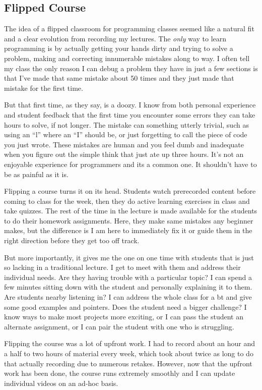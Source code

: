 \documentclass[10pt]{article}
\begin{document}
\subsection{Flipped Course}
The idea of a flipped classroom for programming classes seemed like a natural fit and  a clear evolution from recording my lectures.  
The \textit{only} way to learn programming is by actually getting your hands dirty and trying to solve a problem, making and correcting innumerable mistakes along to way.  
I often tell my class the only reason I can debug a problem  they have  in just a few sections is that I've made that same mistake about 50 times and they just made that mistake for the first time.

But that first time, as they say, is a doozy.  
I know from both personal experience  and student feedback that the first time you encounter some errors they can take hours to solve, if not longer.  
The mistake can  something utterly trivial, such as using an ``l'' where an ``I'' should be, or just forgetting to call the piece of code you just wrote.
These mistakes are human and you feel dumb and inadequate when you figure out the simple think that just ate up three hours.
It's not an enjoyable experience for programmers and its a common one.  
It shouldn't have to be as painful as it is.

Flipping a course turns it on its head.  
Students watch prerecorded content before coming to class for the week, then they do active learning exercises in class and take quizzes.  The rest of the time in the lecture is made available for the students to do their homework assignments.  Here, they make same mistakes any beginner makes, but the difference is I am here to immediately fix it or guide them in the right direction before they get too off track.


But more importantly, it gives me the one on one time with students that is just so lacking in a traditional lecture.  
I get to meet with them and address their individual needs.
Are they having trouble with a particular topic? I can spend a few minutes sitting down with the student and personally explaining it to them.  Are students nearby listening in?  I can address the whole class for a bt and give some good examples and pointers.  Does the student need a bigger challenge? I know ways to make most projects more exciting, or I can pass the student an alternate assignment, or I can pair the student with one who is struggling.

Flipping the course was a lot of upfront work.  
I had to record about an hour and a half to two hours of material every week, which took about twice as long to do that actually recording due to numerous retakes.
However, now that the upfront work has been done, the course runs extremely smoothly and I can update individual videos on an ad-hoc basis.
\end{document}
